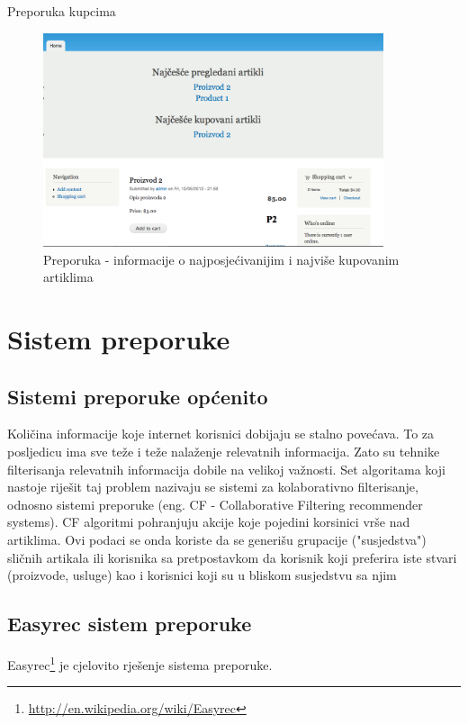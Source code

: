 \documentclass[times, utf8, seminar]{fit}
\begin{document}
{{{Preporuka kupcima

\begin{figure}[H]
\centering
\includegraphics[width=10cm]{img/pregled_rezultata_preporuke.png}
\caption{Preporuka - informacije o najposjećivanijim i najviše kupovanim artiklima}
\end{figure}

\chapter {Sistem preporuke}
\vspace*{-0.7cm}

\section{Sistemi preporuke općenito}

Količina informacije koje internet korisnici dobijaju se stalno povećava. To za posljedicu ima sve teže i teže nalaženje relevatnih informacija. 
Zato su tehnike filterisanja relevatnih informacija dobile na velikoj važnosti. Set algoritama koji nastoje riješit taj problem nazivaju se
sistemi za kolaborativno filterisanje, odnosno sistemi preporuke (eng. CF - Collaborative Filtering recommender systems). 
CF algoritmi pohranjuju akcije koje pojedini korsinici vrše nad artiklima.
Ovi podaci se onda koriste da se generišu grupacije ("susjedstva") sličnih artikala ili korisnika sa pretpostavkom
da korisnik koji preferira iste stvari (proizvode, usluge) kao i korisnici koji su u bliskom susjedstvu sa njim\citep{bac_wien}

\section{Easyrec sistem preporuke}

Easyrec\footnote{\url{http://en.wikipedia.org/wiki/Easyrec}} je cjelovito rješenje sistema preporuke.

}}}
\end{document}
